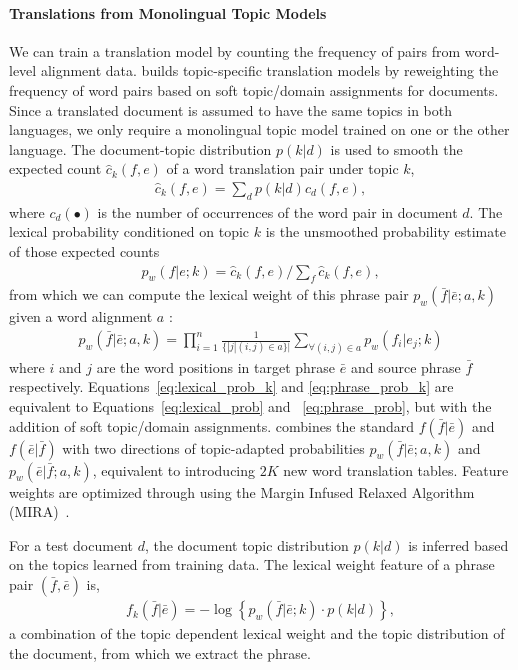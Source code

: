 \paragraph{Translations from Monolingual Topic Models}

We can train a translation model by counting the frequency of pairs from word-level alignment data.
\citet{Eidelman-12} builds topic-specific translation models by reweighting the frequency of word pairs based on soft topic/domain assignments for documents.
Since a translated document is assumed to have the same topics in both languages, we only require a monolingual topic model trained on one or the other language.
The document-topic distribution $p(k|d)$ is used
to smooth the expected count $\hat{c}_{k}(f,e)$ of a word translation
pair under topic $k$,
\begin{align}
\textstyle \hat{c}_{k}(f,e) = \sum_{d}{p(k|d)c_d(f,e)},
\end{align}
where $c_d(\bullet)$ is the number of occurrences of the word pair in
document $d$.  The lexical probability conditioned on topic $k$ is the
unsmoothed probability estimate of those expected counts
\begin{align}
\label{eq:lexical_prob_k}
\textstyle p_w(f|e;k) = \hat{c}_{k}(f,e) / \sum_f{\hat{c}_{k}(f,e)},
\end{align}
from which we can compute the lexical weight of this phrase pair
$p_w(\bar{f}|\bar{e};a, k)$ given a word alignment $a$ \citep{koehn-03}:
\begin{align}
\label{eq:phrase_prob_k}
p_w(\bar{f} | \bar{e};a, k) = \prod^{n}_{i=1} \frac{1}{\{|j | (i, j) \in a\}|} \sum_{\forall (i,j) \in a} p_w(f_i | e_j; k)
\end{align}
where $i$ and $j$ are the word positions in target phrase $\bar{e}$
and source phrase $\bar{f}$ respectively. 
Equations~\ref{eq:lexical_prob_k} and \ref{eq:phrase_prob_k} are equivalent to Equations~\ref{eq:lexical_prob} and ~\ref{eq:phrase_prob}, but with the addition of soft topic/domain assignments.
\citet{Eidelman-12} combines the standard $f(\bar{f}|\bar{e})$ and
$f(\bar{e}|\bar{f})$ with two directions of
topic-adapted probabilities 
$p_w(\bar{f} | \bar{e};a, k)$ and $p_w(\bar{e} | \bar{f};a, k)$, equivalent to introducing $2K$ new word translation tables. 
Feature weights are optimized through
using the Margin Infused Relaxed
  Algorithm (MIRA)~\cite[\textsc{mira}]{Crammer-06}.

For a test document $d$, the document topic distribution $p(k | d)$ is
inferred based on the topics learned from training data. The lexical
weight feature of a phrase pair $(\bar{f}, \bar{e})$ is,
\begin{align}
\textstyle f_{k}(\bar{f}|\bar{e})=-\log\left\{{p_{w}(\bar{f}|\bar{e};k)\cdot p(k|d)}\right\},
\end{align}
a combination of the topic dependent lexical weight and the topic
distribution of the document, from which we extract the phrase.

